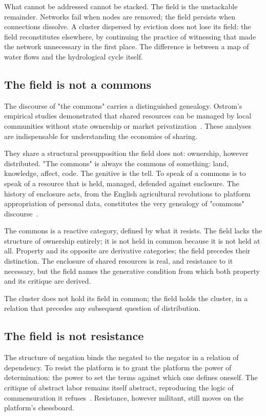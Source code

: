 What cannot be addressed cannot be stacked. The field is the unstackable remainder. Networks fail when nodes are removed; the field persists when connections dissolve. A cluster dispersed by eviction does not lose its field: the field reconstitutes elsewhere, by continuing the practice of witnessing that made the network unnecessary in the first place. The difference is between a map of water flows and the hydrological cycle itself.

\subsection{The field is not a commons}

The discourse of "the commons" carries a distinguished genealogy. Ostrom's empirical studies demonstrated that shared resources can be managed by local communities without state ownership or market privatization~\cite{ostrom1990}. These analyses are indispensable for understanding the economies of sharing.

They share a structural presupposition the field does not: ownership, however distributed. "The commons" is always the commons of something: land, knowledge, affect, code. The genitive is the tell. To speak of a commons is to speak of a resource that is held, managed, defended against enclosure. The history of enclosure acts, from the English agricultural revolutions to platform appropriation of personal data, constitutes the very genealogy of "commons" discourse~\cite{harvey2003}.

The commons is a reactive category, defined by what it resists. The field lacks the structure of ownership entirely; it is not held in common because it is not held at all. Property and its opposite are derivative categories; the field precedes their distinction. The enclosure of shared resources is real, and resistance to it necessary, but the field names the generative condition from which both property and its critique are derived.

The cluster does not hold its field in common; the field holds the cluster, in a relation that precedes any subsequent question of distribution.

\subsection{The field is not resistance}

The structure of negation binds the negated to the negator in a relation of dependency. To resist the platform is to grant the platform the power of determination: the power to set the terms against which one defines oneself. The critique of abstract labor remains itself abstract, reproducing the logic of commensuration it refuses~\cite{postone1993}. Resistance, however militant, still moves on the platform's chessboard.

